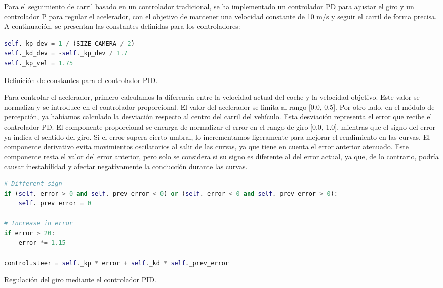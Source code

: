 Para el seguimiento de carril basado en un controlador tradicional, se ha implementado un controlador PD para ajustar el giro y un controlador P para regular el acelerador, con el objetivo de mantener una velocidad constante de 10 m/s y seguir el carril de forma precisa. A continuación, se presentan las constantes definidas para los controladores:
\begin{code}[h]
\begin{lstlisting}[language=Python]
self._kp_dev = 1 / (SIZE_CAMERA / 2)
self._kd_dev = -self._kp_dev / 1.7
self._kp_vel = 1.75
\end{lstlisting}
\caption[Definición de constantes para el controlador \ac{PID}]{Definición de constantes para el controlador \ac{PID}.}
\label{cod:const_pid}
\end{code}

Para controlar el acelerador, primero calculamos la diferencia entre la velocidad actual del coche y la velocidad objetivo. Este valor se normaliza y se introduce en el controlador proporcional. El valor del acelerador se limita al rango [0.0, 0.5]. Por otro lado, en el módulo de percepción, ya habíamos calculado la desviación respecto al centro del carril del vehículo. Esta desviación representa el error que recibe  el controlador PD. El componente proporcional se encarga de normalizar el error en el rango de giro [0.0, 1.0], mientras que el signo del error ya indica el sentido del giro. Si el error supera cierto umbral, lo incrementamos ligeramente para mejorar el rendimiento en las curvas. El componente derivativo evita movimientos oscilatorios al salir de las curvas, ya que tiene en cuenta el error anterior atenuado. Este componente resta el valor del error anterior, pero solo se considera si su signo es diferente al del error actual, ya que, de lo contrario, podría causar inestabilidad y afectar negativamente la conducción durante las curvas.

\begin{code}[h]
\begin{lstlisting}[language=Python]
# Different sign
if (self._error > 0 and self._prev_error < 0) or (self._error < 0 and self._prev_error > 0):
    self._prev_error = 0       

# Increase in error
if error > 20:
    error *= 1.15

control.steer = self._kp * error + self._kd * self._prev_error
\end{lstlisting}
\caption[Regulación del giro mediante el controlador \ac{PID}]{Regulación del giro mediante el controlador \ac{PID}.}
\label{cod:pid_giro}
\end{code}

